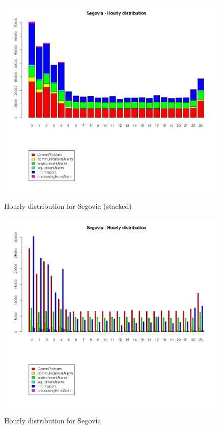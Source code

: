 \documentclass[a4paper,10pt]{book}
\begin{document}
\begin{figure}[h!]
 \centering
 \includegraphics[height=0.4\textheight]{./img/segovia_timeline.png}
 \caption{Hourly distribution for Segovia (stacked)}
\end{figure}
\begin{figure}[h!]
 \centering
 \includegraphics[height=0.4\textheight]{./img/segovia_timeline_b.png}
 \caption{Hourly distribution for Segovia}
\end{figure}
\end{document}
